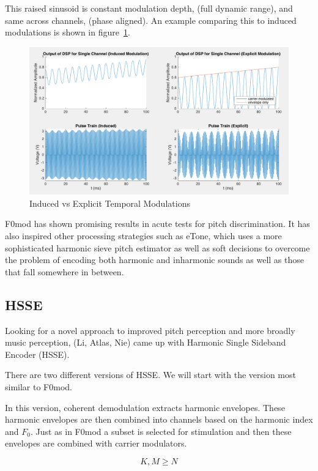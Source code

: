 \documentclass [11pt, proquest] {uwthesis}[2015/03/03]
\begin{document}
This raised sinusoid is constant modulation depth, (full dynamic range), and same across channels, (phase aligned).  An example comparing this to induced modulations is shown in figure~\ref{fig:induced_vs_explicit}.


\begin{figure}[!ht]
  \centering
    \includegraphics[width=1\textwidth]{induced_vs_explicit}   
    \caption{Induced vs Explicit Temporal Modulations}\label{fig:induced_vs_explicit}
\end{figure}

F0mod has shown promising results in acute tests for pitch discrimination.  It has also inspired other processing strategies such as eTone, which uses a more sophisticated harmonic sieve pitch estimator as well as soft decisions to overcome the problem of encoding both harmonic and inharmonic sounds as well as those that fall somewhere in between.

\subsection{HSSE}

Looking for a novel approach to improved pitch perception and more broadly music perception, (Li, Atlas, Nie) came up with Harmonic Single Sideband Encoder (HSSE).

There are two different versions of HSSE.  We will start with the version most similar to F0mod.

In this version, coherent demodulation extracts harmonic envelopes.  These harmonic envelopes are then combined into channels based on the harmonic index and $F_0$.  Just as in F0mod a subset is selected for stimulation and then these envelopes are combined with carrier modulators.

$$K, M \geq N$$
\end{document}
